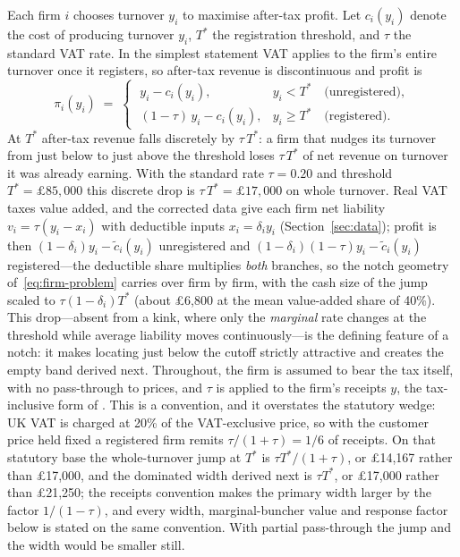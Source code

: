 Each firm $i$ chooses turnover $y_i$ to maximise after-tax profit. Let $c_i(y_i)$
denote the cost of producing turnover $y_i$, $T^{*}$ the registration threshold,
and $\tau$ the standard VAT rate. In the simplest statement VAT applies to the
firm's entire turnover once it registers, so after-tax revenue is discontinuous
and profit is
\begin{equation}
  \pi_i(y_i) \;=\;
  \begin{cases}
    \;y_i - c_i(y_i), & y_i < T^{*} \quad \text{(unregistered)},\\[4pt]
    \;(1-\tau)\,y_i - c_i(y_i), & y_i \ge T^{*} \quad \text{(registered)}.
  \end{cases}
  \label{eq:firm-problem}
\end{equation}
At $T^{*}$ after-tax revenue falls discretely by $\tau\,T^{*}$: a firm
that nudges its turnover from just below to just above the threshold loses
$\tau\,T^{*}$ of net revenue on turnover it was already earning. With the
standard rate $\tau=0.20$ and threshold $T^{*}=\pounds85{,}000$ this discrete
drop is $\tau\,T^{*}=\pounds17{,}000$ on whole turnover. Real VAT taxes value
added, and the corrected data give each firm net liability
$v_i=\tau(y_i-x_i)$ with deductible inputs $x_i=\delta_i y_i$
(Section~\ref{sec:data}); profit is then
$(1-\delta_i)y_i - \tilde c_i(y_i)$ unregistered and
$(1-\delta_i)(1-\tau)y_i - \tilde c_i(y_i)$ registered---the deductible share
multiplies \emph{both} branches, so the notch geometry
of~\eqref{eq:firm-problem} carries over firm by firm, with the cash size of
the jump scaled to $\tau(1-\delta_i)T^{*}$ (about \pounds6{,}800 at the mean
value-added share of 40\%). This drop---absent from a kink, where only the
\emph{marginal} rate changes at the threshold while average liability moves
continuously---is the defining feature of a notch: it makes locating just
below the cutoff strictly attractive and creates the empty band derived next.
Throughout, the firm is assumed to bear the tax itself, with no pass-through
to prices, and $\tau$ is applied to the firm's receipts $y$, the tax-inclusive
form of \citet{klevenwaseem2013}. This is a convention, and it overstates the
statutory wedge: UK VAT is charged at 20\% of the VAT-exclusive price, so with
the customer price held fixed a registered firm remits $\tau/(1+\tau)=1/6$ of
receipts. On that statutory base the whole-turnover jump at $T^{*}$ is
$\tau T^{*}/(1+\tau)$, or \pounds14{,}167 rather than \pounds17{,}000, and the
dominated width derived next is $\tau T^{*}$, or \pounds17{,}000 rather than
\pounds21{,}250; the receipts
convention makes the primary width larger by the factor $1/(1-\tau)$, and
every width, marginal-buncher value and response factor below is stated on the
same convention. With partial pass-through the jump and the width would be
smaller still.

